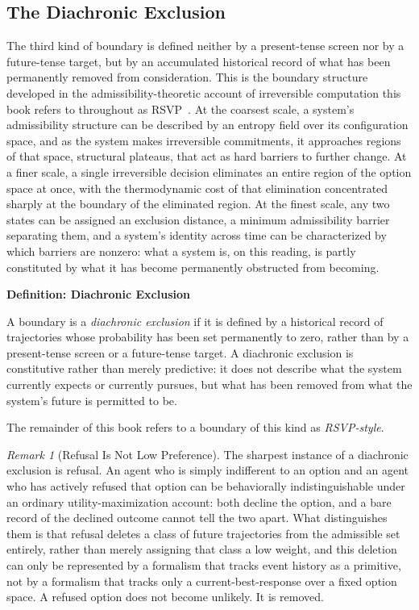 \documentclass[11pt,fleqn]{book}
\numberwithin{equation}{chapter}
\newenvironment{definition}[1]
  {\begin{definitionEnv}
   \noindent\textbf{Definition: #1}\par\smallskip}
  {\end{definitionEnv}}
\theoremstyle{plain}
\theoremstyle{definition}
\theoremstyle{remark}
\newtheorem{remark}[theorem]{Remark}
\begin{document}
\subsection{The Diachronic Exclusion}

The third kind of boundary is defined neither by a present-tense screen nor by a future-tense target, but by an accumulated historical record of what has been permanently removed from consideration. This is the boundary structure developed in the admissibility-theoretic account of irreversible computation this book refers to throughout as RSVP~\cite{holonomic}. At the coarsest scale, a system's admissibility structure can be described by an entropy field over its configuration space, and as the system makes irreversible commitments, it approaches regions of that space, structural plateaus, that act as hard barriers to further change. At a finer scale, a single irreversible decision eliminates an entire region of the option space at once, with the thermodynamic cost of that elimination concentrated sharply at the boundary of the eliminated region. At the finest scale, any two states can be assigned an exclusion distance, a minimum admissibility barrier separating them, and a system's identity across time can be characterized by which barriers are nonzero: what a system is, on this reading, is partly constituted by what it has become permanently obstructed from becoming.

\begin{definition}{Diachronic Exclusion}
A boundary is a \emph{diachronic exclusion} if it is defined by a historical record of trajectories whose probability has been set permanently to zero, rather than by a present-tense screen or a future-tense target. A diachronic exclusion is constitutive rather than merely predictive: it does not describe what the system currently expects or currently pursues, but what has been removed from what the system's future is permitted to be.
\end{definition}

The remainder of this book refers to a boundary of this kind as \emph{RSVP-style}.

\begin{remark}[Refusal Is Not Low Preference]
The sharpest instance of a diachronic exclusion is refusal. An agent who is simply indifferent to an option and an agent who has actively refused that option can be behaviorally indistinguishable under an ordinary utility-maximization account: both decline the option, and a bare record of the declined outcome cannot tell the two apart. What distinguishes them is that refusal deletes a class of future trajectories from the admissible set entirely, rather than merely assigning that class a low weight, and this deletion can only be represented by a formalism that tracks event history as a primitive, not by a formalism that tracks only a current-best-response over a fixed option space. A refused option does not become unlikely. It is removed.
\end{remark}
\end{document}
